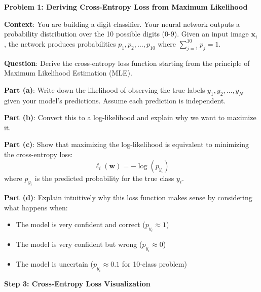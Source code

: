 \documentclass[11pt]{article}
\newcommand{\w}{\mathbf{w}}
\newcommand{\x}{\mathbf{x}}
\begin{document}
\begin{homeworkbox}
\textbf{Problem 1: Deriving Cross-Entropy Loss from Maximum Likelihood}

\textbf{Context}: You are building a digit classifier. Your neural network outputs a probability distribution over the 10 possible digits (0-9). Given an input image $\x_i$, the network produces probabilities $p_1, p_2, \ldots, p_{10}$ where $\sum_{j=1}^{10} p_j = 1$.

\textbf{Question}: Derive the cross-entropy loss function starting from the principle of Maximum Likelihood Estimation (MLE).

\textbf{Part (a)}: Write down the likelihood of observing the true labels $y_1, y_2, \ldots, y_N$ given your model's predictions. Assume each prediction is independent.

\textbf{Part (b)}: Convert this to a log-likelihood and explain why we want to maximize it.

\textbf{Part (c)}: Show that maximizing the log-likelihood is equivalent to minimizing the cross-entropy loss:
$$\ell_i(\w) = -\log(p_{y_i})$$
where $p_{y_i}$ is the predicted probability for the true class $y_i$.

\textbf{Part (d)}: Explain intuitively why this loss function makes sense by considering what happens when:
\begin{itemize}
\item The model is very confident and correct ($p_{y_i} \approx 1$)
\item The model is very confident but wrong ($p_{y_i} \approx 0$)
\item The model is uncertain ($p_{y_i} \approx 0.1$ for 10-class problem)
\end{itemize}
\end{homeworkbox}

\textbf{Step 3: Cross-Entropy Loss Visualization}
\end{document}
